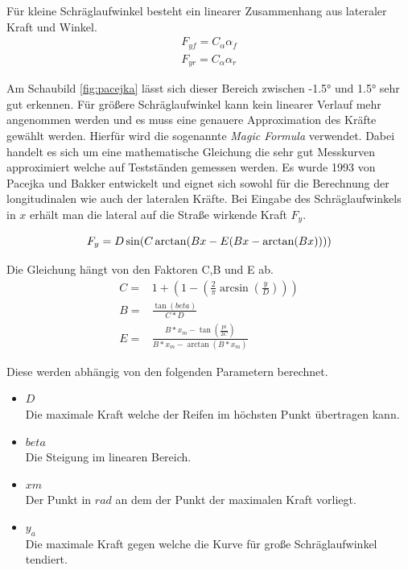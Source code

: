 \documentclass{like}
\begin{document}
Für kleine Schräglaufwinkel besteht ein linearer Zusammenhang aus lateraler Kraft und Winkel. 
\begin{eqnarray}
F_{yf} = C_\alpha \alpha_f \\
F_{yr} = C_\alpha \alpha_r
\end{eqnarray}

Am Schaubild \ref{fig:pacejka} lässt sich dieser Bereich zwischen -1.5° und 1.5° sehr gut erkennen. Für größere Schräglaufwinkel kann kein linearer Verlauf mehr angenommen werden und es muss eine genauere Approximation des Kräfte gewählt werden. Hierfür wird die sogenannte \textit{Magic Formula}  \cite{magicFormula} verwendet. Dabei handelt es sich um eine mathematische Gleichung die sehr gut Messkurven approximiert welche auf Testständen gemessen werden.
Es wurde 1993 von Pacejka und Bakker entwickelt und eignet sich sowohl für die Berechnung der longitudinalen wie auch der lateralen Kräfte. Bei Eingabe des Schräglaufwinkels in \(x\) erhält man die lateral auf die Straße wirkende Kraft \(F_y\). 

\begin{equation}
F_y =  D\sin(C\arctan(Bx - E(Bx - \arctan(Bx))))  \label{eq:magicF} \\
\end{equation}

Die Gleichung hängt von den Faktoren C,B und E ab. 
\begin{eqnarray}
C =& 1 + (1-(\frac{2}{\pi} \arcsin(\frac{y}{D}))) \\
B =& \frac{\tan(beta)}{C*D} \\
E =& \frac{ B * x_m - \tan(\frac{pi}{2 C})}{B*x_m - \arctan(B*x_m)}
\end{eqnarray}


Diese werden abhängig von den folgenden Parametern berechnet.

\begin{itemize}
	\item $D$ \\	
	Die maximale Kraft welche der Reifen im höchsten Punkt übertragen kann.
	\item $beta$\\
	Die Steigung im linearen Bereich. 
	\item $xm$ \\
	Der Punkt in $rad$ an dem der Punkt der maximalen Kraft vorliegt.
	\item $y_a$ \\
	Die maximale Kraft gegen welche die Kurve für große Schräglaufwinkel tendiert. 
\end{itemize}
\end{document}
